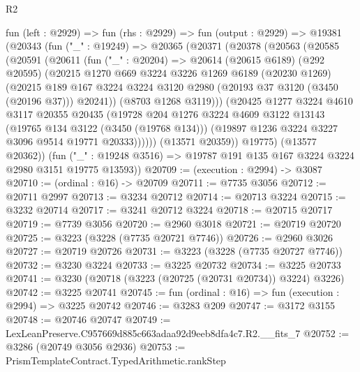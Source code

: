 \begin{lexlean}{R2}
\begin{coremodule}
  fun (left : @2929) =>
  fun (rhs : @2929) =>
  fun (output : @2929) =>
  @19381
    (@20343
      (fun ("_" : @19249) =>
      @20365
        (@20371
          (@20378
            (@20563
              (@20585
                (@20591
                  (@20611
                    (fun ("_" : @20204) =>
                    @20614
                      (@20615 @6189)
                      (@292 @20595)
                      (@20215
                        @1270
                        @669
                        @3224
                        @3226
                        @1269
                        @6189
                        (@20230 @1269)
                        (@20215
                          @189
                          @167
                          @3224
                          @3224
                          @3120
                          @2980
                          (@20193 @37 @3120 (@3450 (@20196 @37)))
                          @20241))
                      (@8703 @1268 @3119)))
                  (@20425
                    @1277
                    @3224
                    @4610
                    @3117
                    @20355
                    @20435
                    (@19728
                      @204
                      @1276
                      @3224
                      @4609
                      @3122
                      @13143
                      (@19765 @134 @3122 (@3450 (@19768 @134)))
                      (@19897 @1236 @3224 @3227 @3096 @9514 @19771 @20333))))))
            (@13571 @20359))
          @19775)
        (@13577 @20362))
      (fun ("_" : @19248 @3516) => @19787 @191 @135 @167 @3224 @3224 @2980 @3151 @19775 @13593))
@20709 := (execution : @2994) -> @3087
@20710 := (ordinal : @16) -> @20709
@20711 := @7735 @3056
@20712 := @20711 @2997
@20713 := @3234 @20712
@20714 := @20713 @3224
@20715 := @3232 @20714
@20717 := @3241 @20712 @3224
@20718 := @20715 @20717
@20719 := @7739 @3056
@20720 := @2960 @3018
@20721 := @20719 @20720
@20725 := @3223 (@3228 (@7735 @20721 @7746))
@20726 := @2960 @3026
@20727 := @20719 @20726
@20731 := @3223 (@3228 (@7735 @20727 @7746))
@20732 := @3230 @3224
@20733 := @3225 @20732
@20734 := @3225 @20733
@20741 := @3230 (@20718 (@3223 (@20725 (@20731 @20734)) @3224) @3226)
@20742 := @3225 @20741
@20745 := fun (ordinal : @16) => fun (execution : @2994) => @3225 @20742
@20746 := @3283 @209
@20747 := @3172 @3155
@20748 := @20746 @20747
@20749 := LexLeanPreserve.C957669d885c663adaa92d9eeb8dfa4c7.R2.__fits_7
@20752 := @3286 (@20749 @3056 @2936)
@20753 := PrismTemplateContract.TypedArithmetic.rankStep

\end{coremodule}
\end{lexlean}
